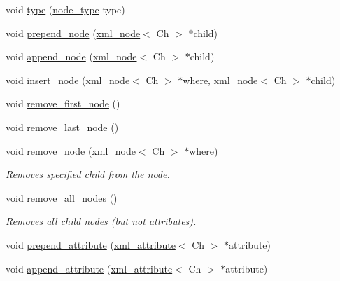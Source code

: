 \begin{DoxyCompactItemize}
\item 
void \hyperlink{classrapidxml_1_1xml__node_a499bbc9300c1b06821d5c08b24164c68}{type} (\hyperlink{namespacerapidxml_abb456db38f7efb746c4330eed6072a7c}{node\_\-type} type)
\item 
void \hyperlink{classrapidxml_1_1xml__node_ae86e92908c3eab40bbed8216e4f3f3cb}{prepend\_\-node} (\hyperlink{classrapidxml_1_1xml__node}{xml\_\-node}$<$ Ch $>$ $\ast$child)
\item 
void \hyperlink{classrapidxml_1_1xml__node_a8696d098ecc9c4d2a646b43e91d58e31}{append\_\-node} (\hyperlink{classrapidxml_1_1xml__node}{xml\_\-node}$<$ Ch $>$ $\ast$child)
\item 
void \hyperlink{classrapidxml_1_1xml__node_a666880f42a7e486d78cc45ed51c7c46d}{insert\_\-node} (\hyperlink{classrapidxml_1_1xml__node}{xml\_\-node}$<$ Ch $>$ $\ast$where, \hyperlink{classrapidxml_1_1xml__node}{xml\_\-node}$<$ Ch $>$ $\ast$child)
\item 
void \hyperlink{classrapidxml_1_1xml__node_a62bf7b276cf7a651a3337f5e0a0ef6ac}{remove\_\-first\_\-node} ()
\item 
void \hyperlink{classrapidxml_1_1xml__node_a9182512e948ec451a83f116cce7c7674}{remove\_\-last\_\-node} ()
\item 
void \hyperlink{classrapidxml_1_1xml__node_a98289923eb9e8889418a9eb0207ea35c}{remove\_\-node} (\hyperlink{classrapidxml_1_1xml__node}{xml\_\-node}$<$ Ch $>$ $\ast$where)
\begin{DoxyCompactList}\small\item\em Removes specified child from the node. \item\end{DoxyCompactList}\item 
void \hyperlink{classrapidxml_1_1xml__node_a95735358b079ae0adcfbbac69aa1fbc3}{remove\_\-all\_\-nodes} ()
\begin{DoxyCompactList}\small\item\em Removes all child nodes (but not attributes). \item\end{DoxyCompactList}\item 
void \hyperlink{classrapidxml_1_1xml__node_a8b62ee76489faf8e2d1210869d547684}{prepend\_\-attribute} (\hyperlink{classrapidxml_1_1xml__attribute}{xml\_\-attribute}$<$ Ch $>$ $\ast$attribute)
\item 
void \hyperlink{classrapidxml_1_1xml__node_a33ce3386f8c42dd4db658b75cbb6e6c4}{append\_\-attribute} (\hyperlink{classrapidxml_1_1xml__attribute}{xml\_\-attribute}$<$ Ch $>$ $\ast$attribute)

\end{DoxyCompactItemize}
